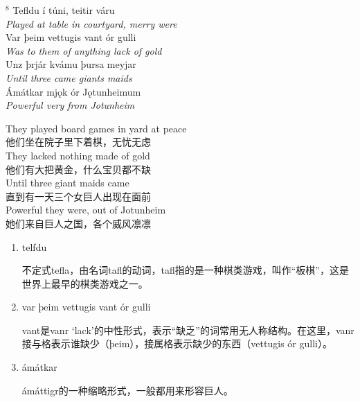 \begin{paracol}{2}
    \noindent
    $^8 $ Tefldu í túni, teitir váru\\
    \textit{Played at table in courtyard, merry were}\\
    Var þeim vettugis vant ór gulli\\
    \textit{Was to them of anything lack of gold}\\
    Unz þrjár kvámu þursa meyjar\\
    \textit{Until three came giants maids}\\
    Ámátkar mjǫk ór Jǫtunheimum\\
    \textit{Powerful very from Jotunheim}\\

    \switchcolumn

    \noindent
    They played board games in yard at peace\\
    他们坐在院子里下着棋，无忧无虑\\
    They lacked nothing made of gold\\
    他们有大把黄金，什么宝贝都不缺\\
    Until three giant maids came\\
    直到有一天三个女巨人出现在面前\\
    Powerful they were, out of Jotunheim\\
    她们来自巨人之国，各个威风凛凛\\

\end{paracol}

\begin{grammar*}{}
    \begin{enumerate}[leftmargin=*]
        \item telfdu

              不定式tefla，由名词tafl的动词，tafl指的是一种棋类游戏，叫作“板棋”，这是世界上最早的棋类游戏之一。

        \item var þeim vettugis vant ór gulli

              vant是vanr `lack'的中性形式，表示“缺乏”的词常用无人称结构。在这里，vanr接与格表示谁缺少（þeim），接属格表示缺少的东西（vettugis ór gulli）。
        \item ámátkar

              ámáttigr的一种缩略形式，一般都用来形容巨人。
    \end{enumerate}
\end{grammar*}